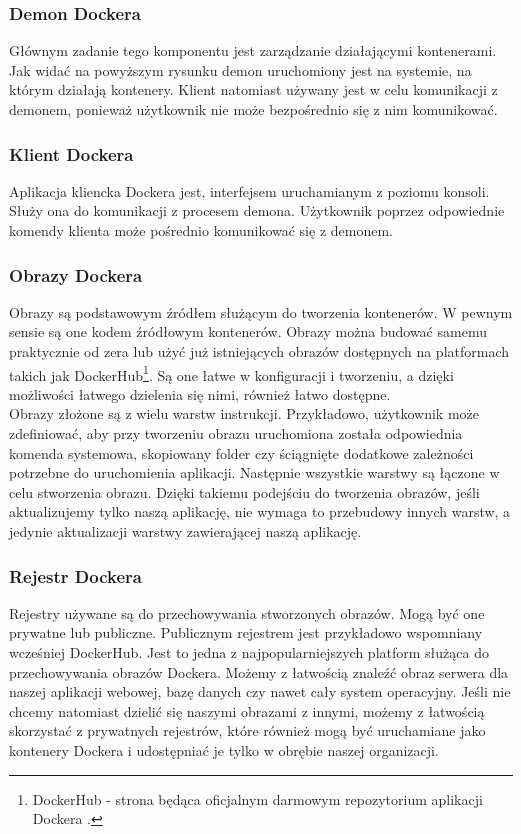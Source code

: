 \documentclass[12pt]{report}
\let\Oldsubsubsection\subsubsection
\renewcommand{\subsubsection}{\FloatBarrier\Oldsubsubsection}
\begin{document}
\subsubsection{Demon Dockera}
Głównym zadanie tego komponentu jest zarządzanie działającymi kontenerami. Jak widać na powyższym rysunku demon uruchomiony jest na systemie, na którym działają kontenery. Klient natomiast używany jest w celu komunikacji z demonem, ponieważ użytkownik nie może bezpośrednio się z nim komunikować.

\subsubsection{Klient Dockera}
Aplikacja kliencka Dockera jest, interfejsem uruchamianym z poziomu konsoli. Służy ona do komunikacji z procesem demona. Użytkownik poprzez odpowiednie komendy klienta może pośrednio komunikować się z demonem.

\subsubsection{Obrazy Dockera}
Obrazy są podstawowym źródłem służącym do tworzenia kontenerów. W pewnym sensie są one kodem źródłowym kontenerów. Obrazy można budować samemu praktycznie od zera lub użyć już istniejących obrazów dostępnych na platformach takich jak DockerHub\footnote{DockerHub - strona będąca oficjalnym darmowym repozytorium aplikacji Dockera \cite{dockerhub}.}. Są one łatwe w konfiguracji i tworzeniu, a dzięki możliwości łatwego dzielenia się nimi, również łatwo dostępne. \\
\indent Obrazy złożone są z wielu warstw instrukcji. Przykładowo, użytkownik może zdefiniować, aby przy tworzeniu obrazu uruchomiona została odpowiednia komenda systemowa, skopiowany folder czy ściągnięte dodatkowe zależności potrzebne do uruchomienia aplikacji. Następnie wszystkie warstwy są łączone w celu stworzenia obrazu. Dzięki takiemu podejściu do tworzenia obrazów, jeśli aktualizujemy tylko naszą aplikację, nie wymaga to przebudowy innych warstw, a jedynie aktualizacji warstwy zawierającej naszą aplikację.

\subsubsection{Rejestr Dockera}
Rejestry używane są do przechowywania stworzonych obrazów. Mogą być one prywatne lub publiczne. Publicznym rejestrem jest przykładowo wspomniany wcześniej DockerHub. Jest to jedna z najpopularniejszych platform służąca do przechowywania obrazów Dockera. Możemy z łatwością znaleźć obraz serwera dla naszej aplikacji webowej, bazę danych czy nawet cały system operacyjny. Jeśli nie chcemy natomiast dzielić się naszymi obrazami z innymi, możemy z łatwością skorzystać z prywatnych rejestrów, które również mogą być uruchamiane jako kontenery Dockera i udostępniać je tylko w obrębie naszej organizacji.
\end{document}
